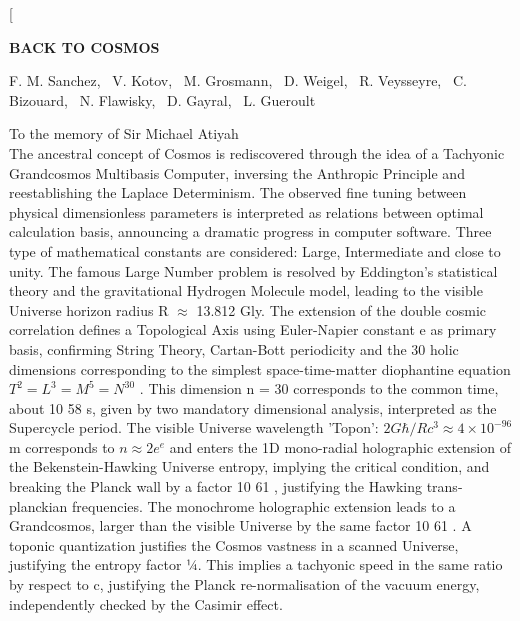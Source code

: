 \documentclass[twoside,draft]{article}
\begin{document}
\renewcommand{\refname}{References}
\renewcommand{\tablename}{\small Table}
\renewcommand{\figurename}{\small Fig.}
\renewcommand{\contentsname}{Contents}


\twocolumn[%
\begin{center}
\renewcommand{\baselinestretch}{0.93}
{\Large\bfseries BACK TO COSMOS

}\par
\renewcommand{\baselinestretch}{1.0}
\bigskip
F. M. Sanchez, \ V. Kotov, \ M. Grosmann, \ D. Weigel, \ R. Veysseyre, \ C. Bizouard, \ N. Flawisky, \ D. Gayral, \ L. Gueroult\\
\par
\medskip
{\small\parbox{11cm}{%
To the memory of Sir Michael Atiyah\\
The ancestral concept of Cosmos is rediscovered through the idea of a Tachyonic
Grandcosmos Multibasis Computer, inversing the Anthropic Principle and reestablishing
the Laplace Determinism. The observed fine tuning between physical dimensionless
parameters is interpreted as relations between optimal calculation basis, announcing a
dramatic progress in computer software. Three type of mathematical constants are
considered: Large, Intermediate and close to unity. The famous Large Number problem is
resolved by Eddington's statistical theory and the gravitational Hydrogen Molecule model,
leading to the visible Universe horizon radius R $\approx$ 13.812 Gly. The extension of
the double cosmic correlation defines a Topological Axis using Euler-Napier constant e as
primary basis, confirming String Theory, Cartan-Bott periodicity and the 30 holic
dimensions corresponding to the simplest space-time-matter diophantine equation $T^2 = L^3 =
M^5 = N^30$ . This dimension n = 30 corresponds to the common time, about 10 58 s, given by
two mandatory dimensional analysis, interpreted as the Supercycle period. The visible
Universe wavelength 'Topon': $2G \hbar / Rc^{3} \approx 4 \times 10^{-96}$ m corresponds to $n \approx 2e^{e}$ and enters the 1D
mono-radial holographic extension of the Bekenstein-Hawking Universe entropy, implying
the critical condition, and breaking the Planck wall by a factor 10 61 , justifying the Hawking
trans-planckian frequencies. The monochrome holographic extension leads to a
Grandcosmos, larger than the visible Universe by the same factor 10 61 . A toponic
quantization justifies the Cosmos vastness in a scanned Universe, justifying the entropy
factor 1⁄4. This implies a tachyonic speed in the same ratio by respect to c, justifying the
Planck re-normalisation of the vacuum energy, independently checked by the Casimir effect.
}}
\end{center}
\end{document}

